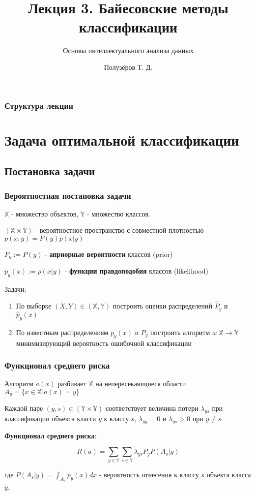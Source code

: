 \documentclass{beamer}
\title[Байесовские методы классификации]{Лекция 3. Байесовские методы классификации}
\subtitle{Основы интеллектуального анализа данных}
\author{Полузёров Т. Д.}
\institute{БГУ ФПМИ}
\date{}
\begin{document}
	
	\begin{frame}
		\titlepage
	\end{frame}
	
	\begin{center}
		\frametitle{Структура лекции}
		\tableofcontents	
	\end{center}
	
	\section{Задача оптимальной классификации}
	
	\subsection{Постановка задачи}
	
	\begin{frame}
		\frametitle{Вероятностная постановка задачи}
		 $\mathbb{X}$ - множество объектов, $\mathbb{Y}$ - множество классов.
		 
		$(\mathbb{X} \times \mathbb{Y})$ - вероятностное пространство с совместной плотностью $p(x, y) = P(y) p(x | y)$
		 
		 \vspace{5pt}
		 
		$P_y := P(y)$ - \textbf{априорные вероятности} классов (prior)
		
		$p_y(x) := p(x | y)$ - \textbf{функции правдоподобия} классов (likelihood)
		
		\vspace{15pt}
		
		Задачи:
		
		\begin{enumerate}
			\item По выборке $(X, Y) \in (\mathbb{X}, \mathbb{Y})$ построить оценки распределений $\hat{P}_y$ и $\hat{p}_y(x)$
			\item По известным распределениям $p_y(x)$ и $P_y$ построить алгоритм $a: \mathbb{X} \rightarrow \mathbb{Y}$ минимизирующий вероятность ошибочной классификации
		\end{enumerate}
	\end{frame}
	
	\begin{frame}
		\frametitle{Функционал среднего риска}
		Алгоритм $a(x)$ разбивает $\mathbb{X}$ на непересекающиеся области $A_y = \{x \in \mathbb{X} | a(x) = y \}$
		
		\vspace{10pt}
		
		Каждой паре $(y, s) \in (\mathbb{Y} \times \mathbb{Y})$ соответствует величина потери $\lambda_{ys}$ при классификации объекта класса $y$ к классу $s$, $\lambda_{yy} = 0$ и $\lambda_{ys} > 0$ при $y \ne s$
		
		\vspace{10pt}
		
		\textbf{Функционал среднего риска}:
		
		 \[
		 R(a) = \sum_{y \in \mathbb{Y}} \sum_{s \in \mathbb{Y}}
		 \lambda_{ys} P_y P(A_s | y)
		 \]
		 
		 где $P(A_s | y) = \int_{A_s} p_y(x) dx$ - вероятность отнесения к классу $s$ объекта класса $y$.	 
	\end{frame}
	
\end{document}
